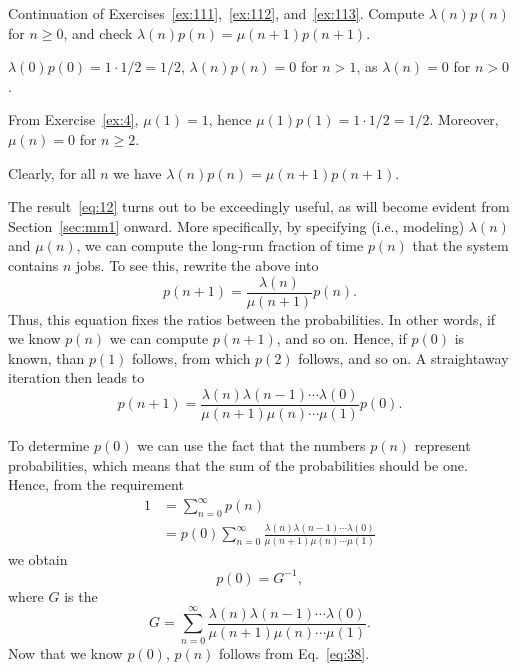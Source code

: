 \begin{exercise} Continuation of Exercises~\ref{ex:111},~\ref{ex:112}, and~\ref{ex:113}.  Compute 
$\lambda(n) p(n)$ for $n\geq 0$, and check $\lambda(n) p(n) = \mu(n+1) p(n+1)$. 
\begin{solution}
  $\lambda(0)p(0)=1\cdot 1/2 = 1/2$, $\lambda(n)p(n)= 0$ for $n>1$, as $\lambda(n)=0$ for $n>0$.

From Exercise~\ref{ex:4}, $\mu(1)=1$, hence $\mu(1) p(1) = 1\cdot 1/2 = 1/2$. Moreover, $\mu(n)=0$ for $n\geq 2$. 

Clearly, for all $n$ we have $\lambda(n)p(n)= \mu(n+1)p(n+1)$. 

\end{solution}
\end{exercise}

The result~\ref{eq:12} turns out to be exceedingly useful, as will become evident from Section~\ref{sec:mm1} onward. More specifically, by specifying (i.e., modeling) $\lambda(n)$ and $\mu(n)$, we can compute the long-run fraction of
time $p(n)$ that the system contains $n$ jobs. To see this, rewrite
the above into
\begin{equation}\label{eq:25}
  p(n+1) = \frac{\lambda(n)}{\mu(n+1)}p(n). 
\end{equation}
Thus, this equation fixes the ratios between the probabilities. In other words, if we know $p(n)$ we can compute $p(n+1)$, and so on. Hence, if $p(0)$ is known, than $p(1)$ follows, from which $p(2)$
follows, and so on. A straightaway iteration then leads to
\begin{equation}\label{eq:38}
  p(n+1) = \frac{\lambda(n)\lambda(n-1)\cdots \lambda(0)}{\mu(n+1)\mu(n)\cdots \mu(1)}p(0).
\end{equation}

To determine $p(0)$ we can use the fact that the numbers $p(n)$ represent probabilities, which means that the sum of the probabilities should be one. Hence, from the requirement
\begin{align*}
1 
&= \sum_{n=0}^\infty p(n) \\
&= p(0) \sum_{n=0}^\infty \frac{\lambda(n)\lambda(n-1)\cdots\lambda(0)}{\mu(n+1)\mu(n)\cdots \mu(1)}
\end{align*}
we obtain  
\begin{equation*}
  p(0) = G^{-1},
\end{equation*}
where $G$ is the 
\begin{equation}
  \label{eq:20}
G = \sum_{n=0}^\infty \frac{\lambda(n)\lambda(n-1)\cdots\lambda(0)}{\mu(n+1)\mu(n)\cdots \mu(1)}.
\end{equation}
Now that we know $p(0)$,  $p(n)$ follows from Eq.~\eqref{eq:38}. 

